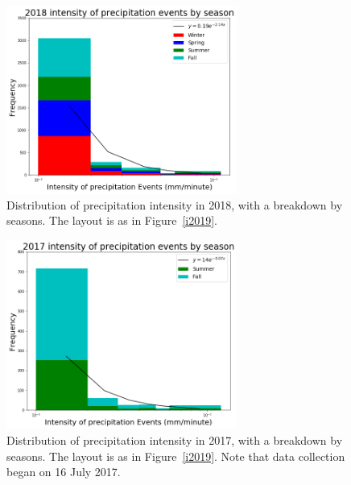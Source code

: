 \documentclass[11pt]{report}
\begin{document}
\clearpage
\begin{figure}[t]
\centering
\includegraphics[width=0.675\textwidth]{Figures/inten2018.png}
\caption[Intensity histogram for 2018 broken down by season]
        {\label{i2018}Distribution of precipitation intensity in 2018,
          with a breakdown by seasons. The layout is as in
          Figure~\ref{i2019}.}
\end{figure}

\begin{figure}[b]
\centering
\includegraphics[width=0.675\textwidth]{Figures/inten2017.png}
\caption[Intensity histogram for 2017 broken down by season]
        {\label{i2017}Distribution of precipitation intensity in 2017,
          with a breakdown by seasons. The layout is as in
          Figure~\ref{i2019}. Note that data collection began on 16
          July 2017.}
\end{figure}
\clearpage



\end{document}
